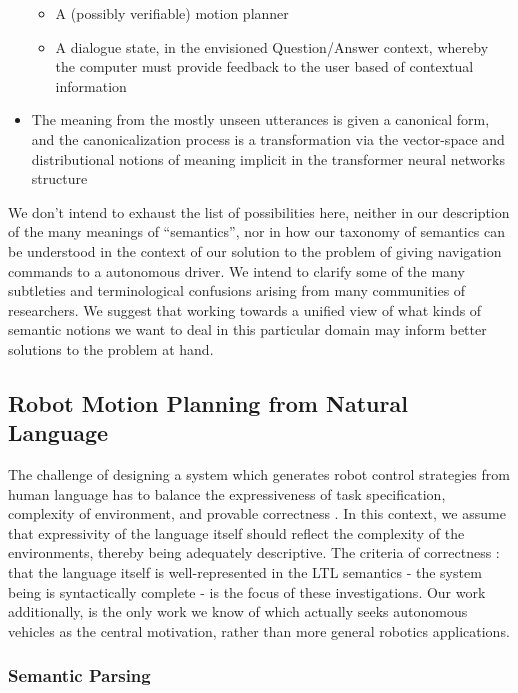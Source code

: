 \documentclass[a4paper, 11pt]{article}
\begin{document}
\begin{itemize}
\begin{itemize}
    \item A (possibly verifiable) motion planner  \cite{verifiedMotion} \cite{7759412} \cite{kuo2020deep}
    \item A dialogue state, in the envisioned Question/Answer context, whereby
      the computer must provide feedback to the user based of contextual information
  \end{itemize}
\item The meaning from the mostly unseen utterances is given a canonical form,
  and the canonicalization process is a transformation via the vector-space and
  distributional notions of meaning implicit in the transformer neural networks structure
\end{itemize}

We don't intend to exhaust the list of possibilities here, neither in our
description of the many meanings of ``semantics'', nor in how our taxonomy of
semantics can be understood in the context of our solution to the problem of
giving navigation commands to a autonomous driver. We intend to clarify some of
the many subtleties and terminological confusions arising from many
communities of researchers. We suggest that working towards a unified view of
what kinds of semantic notions we want to deal in this particular domain may
inform better solutions to the problem at hand.


\subsection{Robot Motion Planning from Natural Language}

The challenge of designing a system which generates robot control strategies
from human language has to balance the expressiveness of task specification,
complexity of environment, and provable correctness \cite{4141034}. In this
context, we assume that expressivity of the language itself should reflect the
complexity of the environments, thereby being adequately descriptive. The
criteria of correctness : that the language itself is well-represented in the
LTL semantics - the system being is syntactically complete - is the focus of
these investigations. Our work additionally, is the only work we know of which
actually seeks autonomous vehicles as the central motivation, rather than more
general robotics applications.

\subsubsection{Semantic Parsing}
\end{document}

